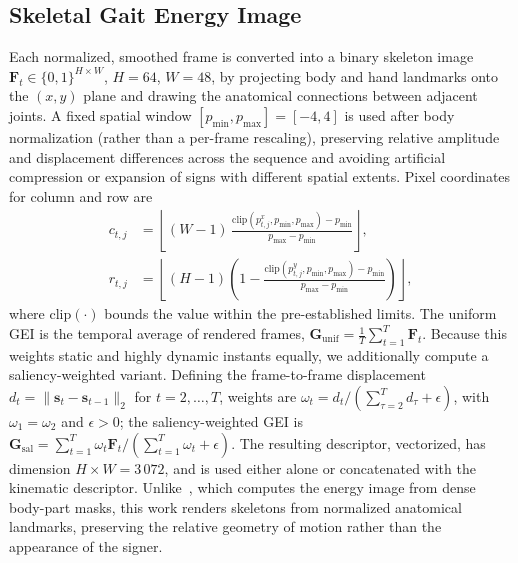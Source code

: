 \documentclass[journal]{IEEEtran}
\begin{document}
\subsection{Skeletal Gait Energy Image}
Each normalized, smoothed frame is converted into a binary skeleton image $\mathbf{F}_t\in\{0,1\}^{H\times W}$, $H=64$, $W=48$, by projecting body and hand landmarks onto the $(x,y)$ plane and drawing the anatomical connections between adjacent joints. A fixed spatial window $[p_{\min},p_{\max}]=[-4,4]$ is used after body normalization (rather than a per-frame rescaling), preserving relative amplitude and displacement differences across the sequence and avoiding artificial compression or expansion of signs with different spatial extents. Pixel coordinates for column and row are
\begin{align}
c_{t,j} &= \left\lfloor (W-1)\,\frac{\mathrm{clip}(p^x_{t,j},p_{\min},p_{\max})-p_{\min}}{p_{\max}-p_{\min}} \right\rfloor, \\
r_{t,j} &= \left\lfloor (H-1)\left(1-\frac{\mathrm{clip}(p^y_{t,j},p_{\min},p_{\max})-p_{\min}}{p_{\max}-p_{\min}}\right) \right\rfloor,
\label{eq:gei_pixel}
\end{align}
where $\mathrm{clip}(\cdot)$ bounds the value within the pre-established limits. The uniform GEI is the temporal average of rendered frames, $\mathbf{G}_{\mathrm{unif}}=\frac{1}{T}\sum_{t=1}^{T}\mathbf{F}_t$. Because this weights static and highly dynamic instants equally, we additionally compute a saliency-weighted variant. Defining the frame-to-frame displacement $d_t=\|\mathbf{s}_t-\mathbf{s}_{t-1}\|_2$ for $t=2,\dots,T$, weights are $\omega_t = d_t / (\sum_{\tau=2}^{T}d_\tau+\epsilon)$, with $\omega_1=\omega_2$ and $\epsilon>0$; the saliency-weighted GEI is $\mathbf{G}_{\mathrm{sal}} = \sum_{t=1}^{T}\omega_t\mathbf{F}_t / (\sum_{t=1}^{T}\omega_t+\epsilon)$. The resulting descriptor, vectorized, has dimension $H\times W = 3\,072$, and is used either alone or concatenated with the kinematic descriptor. Unlike~\cite{passos2021}, which computes the energy image from dense body-part masks, this work renders skeletons from normalized anatomical landmarks, preserving the relative geometry of motion rather than the appearance of the signer.
\end{document}
